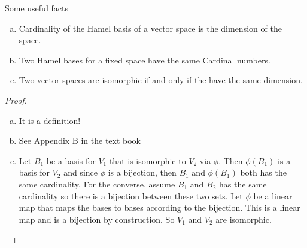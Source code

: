  \begin{summary}
 	Some useful facts
 	\begin{enumerate}[(a)]
 		\item Cardinality of the Hamel basis of a vector space is the dimension of the space.
 		\item Two Hamel bases for a fixed space have the same Cardinal numbers.
 		\item Two vector spaces are isomorphic if and only if the have the same dimension.
 	\end{enumerate}
 	\begin{proof}
 		\begin{enumerate}[(a)]
 			\item It is a definition!
 			\item See Appendix B in the text book
 			\item Let $ B_1 $ be a basis for $ V_1 $ that is isomorphic to $ V_2 $ via $ \phi $. Then $ \phi(B_1) $ is a basis for $ V_2 $ and since $ \phi $ is a bijection, then $ B_1 $ and $ \phi(B_1) $ both has the same cardinality. For the converse, assume $ B_1 $ and $ B_2 $ has the same cardinality so there is a bijection between these two sets. Let $ \phi $ be a linear map that maps the bases to bases according to the bijection. This is a linear map and is a bijection by construction. So $ V_1 $ and $ V_2 $ are isomorphic.
 		\end{enumerate}
 	\end{proof}
 \end{summary}
 

 
 
